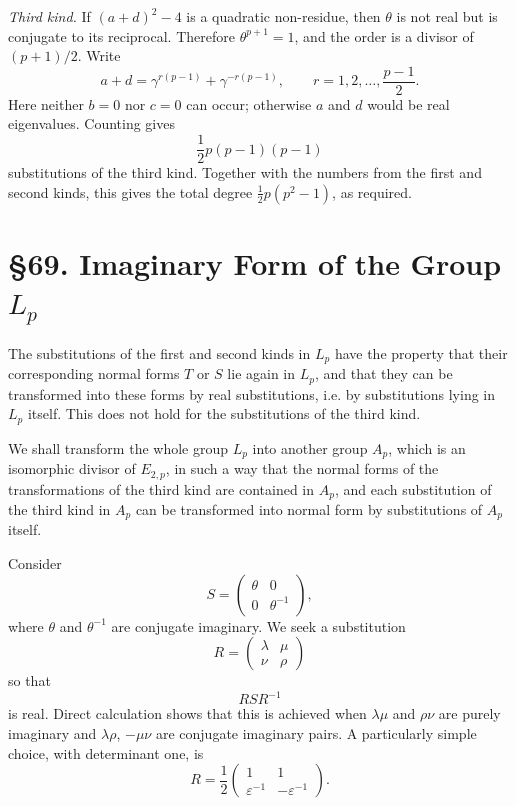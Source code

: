 \documentclass[11pt,a4paper]{book}
\newcommand{\webersection}[2]{\clearpage\section*{\S #1. #2}}
\begin{document}
\emph{Third kind.}  If \((a+d)^2-4\) is a quadratic non-residue, then \(\theta\) is not real but is conjugate to its reciprocal.  Therefore \(\theta^{p+1}=1\), and the order is a divisor of \((p+1)/2\).  Write
\begin{equation}\label{eq:68-11}
 a+d=\gamma^{r(p-1)}+\gamma^{-r(p-1)},
 \qquad r=1,2,\ldots,\frac{p-1}{2}.
\end{equation}
Here neither \(b=0\) nor \(c=0\) can occur; otherwise \(a\) and \(d\) would be real eigenvalues.  Counting gives
\begin{equation}\label{eq:68-count3}
 \frac12p(p-1)(p-1)
\end{equation}
substitutions of the third kind.  Together with the numbers from the first and second kinds, this gives the total degree \(\frac12p(p^2-1)\), as required.

\webersection{69}{Imaginary Form of the Group \(L_p\)}

The substitutions of the first and second kinds in \(L_p\) have the property that their corresponding normal forms \(T\) or \(S\) lie again in \(L_p\), and that they can be transformed into these forms by real substitutions, i.e. by substitutions lying in \(L_p\) itself.  This does not hold for the substitutions of the third kind.

We shall transform the whole group \(L_p\) into another group \(A_p\), which is an isomorphic divisor of \(E_{2,p}\), in such a way that the normal forms of the transformations of the third kind are contained in \(A_p\), and each substitution of the third kind in \(A_p\) can be transformed into normal form by substitutions of \(A_p\) itself.

Consider
\begin{equation}\label{eq:69-1}
 S=\begin{pmatrix}\theta&0\\0&\theta^{-1}\end{pmatrix},
\end{equation}
where \(\theta\) and \(\theta^{-1}\) are conjugate imaginary.  We seek a substitution
\begin{equation}\label{eq:69-2}
 R=\begin{pmatrix}\lambda&\mu\\\nu&\rho\end{pmatrix}
\end{equation}
so that
\begin{equation}\label{eq:69-3}
 RSR^{-1}
\end{equation}
is real.  Direct calculation shows that this is achieved when \(\lambda\mu\) and \(\rho\nu\) are purely imaginary and \(\lambda\rho\), \(-\mu\nu\) are conjugate imaginary pairs.  A particularly simple choice, with determinant one, is
\begin{equation}\label{eq:69-4}
 R=\frac12\begin{pmatrix}1&1\\ \varepsilon^{-1}&-\varepsilon^{-1}\end{pmatrix}.
\end{equation}
\end{document}
